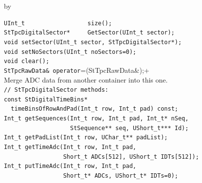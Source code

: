 \documentclass[twoside]{article}
\newcommand{\entrylabel}[1]{\mbox{\textbf{{#1}}}\hfil}%
\newenvironment{entry}
{\begin{list}{}%
    {\renewcommand{\makelabel}{\entrylabel}%
     \setlength{\labelwidth}{90pt}%
     \setlength{\leftmargin}{\labelwidth}
     \advance\leftmargin by \labelsep%
      }%
    }%
  {\end{list}}
\newcommand{\Entrylabel}[1]%
{\raisebox{0pt}[1ex][0pt]{\makebox[\labelwidth][l]%
    {\parbox[t]{\labelwidth}{\hspace{0pt}\textbf{{#1}}}}}}
\newenvironment{Entry}%
{\renewcommand{\entrylabel}{\Entrylabel}\begin{entry}}%
  {\end{entry}}
\begin{document}
\begin{Entry}
\item[Public Member\\ Functions]
    \verb+UInt_t                  size();+\\
    \verb+StTpcDigitalSector*     GetSector(UInt_t sector);+\\
    \verb+void setSector(UInt_t sector, StTpcDigitalSector*);+\\
    \verb+void setNoSectors(UInt_t noSectors=0);+\\
    \verb+void clear();+\\
    \verb+StTpcRawData& operator+=(StTpcRawData&);+\\
        Merge ADC data from another container into this one.\\
    \verb+// StTpcDigitalSector methods:+\\
    \verb+const StDigitalTimeBins*+\\
    \verb+  timeBinsOfRowAndPad(Int_t row, Int_t pad) const;+\\
    \verb+Int_t getSequences(Int_t row, Int_t pad, Int_t* nSeq,+\\
    \verb+                   StSequence** seq, UShort_t*** Id);+\\
    \verb+Int_t getPadList(Int_t row, UChar_t** padList);+\\
    \verb+Int_t getTimeAdc(Int_t row, Int_t pad,+\\
    \verb+                 Short_t ADCs[512], UShort_t IDTs[512]);+\\
    \verb+Int_t putTimeAdc(Int_t row, Int_t pad,+\\
    \verb+                 Short_t* ADCs, UShort_t* IDTs=0);+\\
\end{Entry}
\clearpage

\end{document}
